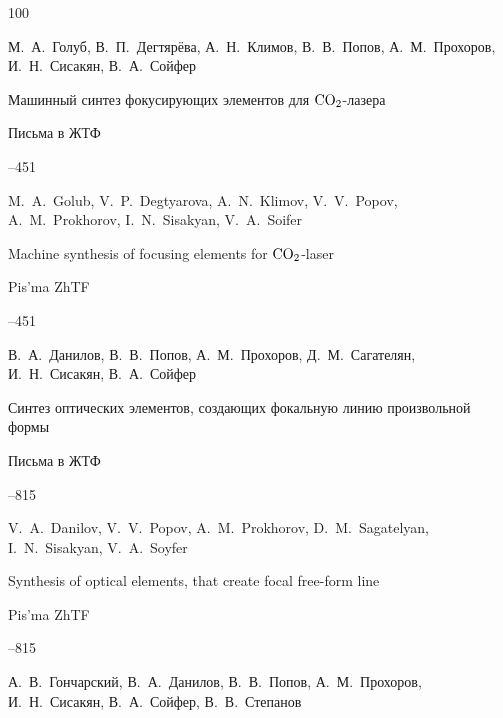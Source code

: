 \begin{thebibliography}{100}

\by М.~А.~Голуб, В.~П.~Дегтярёва, А.~Н.~Климов, В.~В.~Попов, А.~М.~Прохоров, И.~Н.~Сисакян, В.~А.~Сойфер

\paper Машинный синтез фокусирующих элементов для $\rm CO_2$-лазера

\jour Письма в ЖТФ




--451

\misctransl

\by M.~A.~Golub, V.~P.~Degtyarova, A.~N.~Klimov, V.~V.~Popov, A.~M.~Prokhorov, I.~N.~Sisakyan, V.~A.~Soifer

\paper Machine synthesis of focusing elements for $\rm CO_2$-laser

\jour Pis'ma ZhTF




--451




\by В.~А.~Данилов, В.~В.~Попов, А.~М.~Прохоров, Д.~М.~Сагателян, И.~Н.~Сисакян, В.~А.~Сойфер

\paper Синтез оптических элементов, создающих фокальную линию произвольной формы

\jour Письма в ЖТФ




--815

\misctransl

\by V.~A.~Danilov, V.~V.~Popov, A.~M.~Prokhorov, D.~M.~Sagatelyan, I.~N.~Sisakyan, V.~A.~Soyfer

\paper Synthesis of optical elements, that create focal free-form line 

\jour Pis'ma ZhTF




--815




\by А.~В.~Гончарский, В.~А.~Данилов, В.~В.~Попов, А.~М.~Прохоров, И.~Н.~Сисакян, В.~А.~Сойфер, В.~В.~Степанов


\end{thebibliography}
